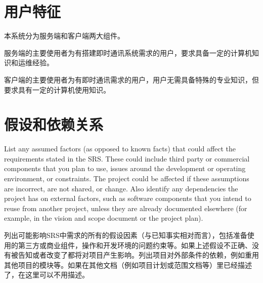 \section{用户特征}
%
%

本系统分为服务端和客户端两大组件。

服务端的主要使用者为有搭建即时通讯系统需求的用户，要求具备一定的计算机知识和运维经验。

客户端的主要使用者为有即时通讯需求的用户，用户无需具备特殊的专业知识，但要求具有一定的计算机使用知识。

\section{假设和依赖关系}
List any assumed factors (as opposed to known facts) that could affect the requirements stated in the SRS. These could include third party or commercial components that you plan to use, issues around the development or operating environment, or constraints. The project could be affected if these assumptions are incorrect, are not shared, or change. Also identify any dependencies the project has on external factors, such as software components that you intend to reuse from another project, unless they are already documented elsewhere (for example, in the vision and scope document or the project plan). 

列出可能影响SRS中需求的所有的假设因素（与已知事实相对而言），包括准备使用的第三方或商业组件，操作和开发环境的问题约束等。如果上述假设不正确、没有被告知或者改变了都将对项目产生影响。列出项目对外部条件的依赖，例如重用其他项目的模块等。如果在其他文档（例如项目计划或范围文档等）里已经描述了，在这里可以不用描述。
